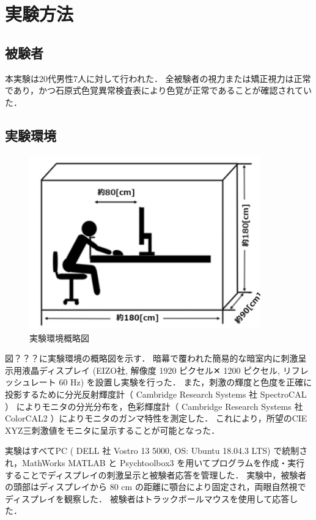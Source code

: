 \section{実験方法}
    \subsection{被験者}
        本実験は20代男性7人に対して行われた．
        全被験者の視力または矯正視力は正常であり，かつ石原式色覚異常検査表により色覚が正常であることが確認されていた．

    \subsection{実験環境}

        \begin{figure}[h]
            \centering
            \includegraphics[width=10.0cm]{./img/darkroom_p.png}
            \caption{実験環境概略図}
            \label{darkroom}
        \end{figure}

        図？？？に実験環境の概略図を示す．
        暗幕で覆われた簡易的な暗室内に刺激呈示用液晶ディスプレイ (EIZO社, 解像度 1920 ピクセル✕ 1200 ピクセル, リフレッシュレート 60 Hz) を設置し実験を行った．
        また，刺激の輝度と色度を正確に投影するために分光反射輝度計（ Cambridge Research Systems 社 SpectroCAL ） によりモニタの分光分布を，色彩輝度計（ Cambridge Research Systems 社 ColorCAL2 ）によりモニタのガンマ特性を測定した．
        これにより，所望のCIE XYZ三刺激値をモニタに呈示することが可能となった．
        
        実験はすべてPC ( DELL 社 Vostro 13 5000, OS: Ubuntu 18.04.3 LTS) で統制され，MathWorks MATLAB と Psychtoolbox3\cite{Psychtoolbox} を用いてプログラムを作成・実行することでディスプレイの刺激呈示と被験者応答を管理した．
        実験中，被験者の頭部はディスプレイから 80 cm の距離に顎台により固定され，両眼自然視でディスプレイを観察した．
        被験者はトラックボールマウスを使用して応答した．

